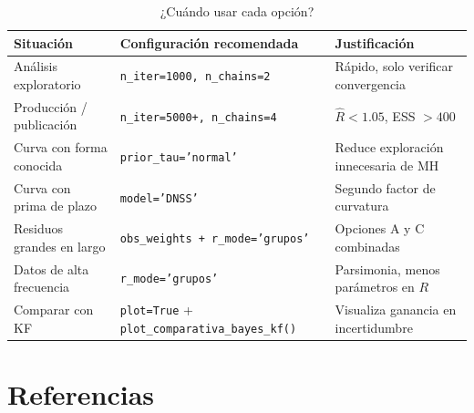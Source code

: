\documentclass[12pt, a4paper]{article}
\theoremstyle{plain}
\theoremstyle{definition}
\theoremstyle{remark}
\begin{document}
\begin{table}[H]
\centering
\caption{¿Cuándo usar cada opción?}
\small
\begin{tabular}{L{3.5cm} L{5.5cm} L{5cm}}
\toprule
\textbf{Situación} & \textbf{Configuración recomendada} & \textbf{Justificación} \\
\midrule
Análisis exploratorio & \texttt{n\_iter=1000, n\_chains=2} & Rápido, solo verificar convergencia \\
\addlinespace
Producción / publicación & \texttt{n\_iter=5000+, n\_chains=4} & $\hat{R} < 1.05$, ESS $> 400$ \\
\addlinespace
Curva con forma conocida & \texttt{prior\_tau='normal'} & Reduce exploración innecesaria de MH \\
\addlinespace
Curva con prima de plazo & \texttt{model='DNSS'} & Segundo factor de curvatura \\
\addlinespace
Residuos grandes en largo & \texttt{obs\_weights + r\_mode='grupos'} & Opciones A y C combinadas \\
\addlinespace
Datos de alta frecuencia & \texttt{r\_mode='grupos'} & Parsimonia, menos parámetros en $R$ \\
\addlinespace
Comparar con KF & \texttt{plot=True} + \texttt{plot\_comparativa\_bayes\_kf()} & Visualiza ganancia en incertidumbre \\
\bottomrule
\end{tabular}
\end{table}

\section*{Referencias}
\end{document}
